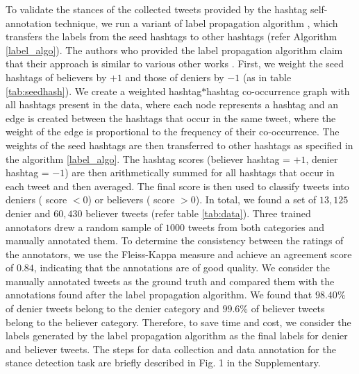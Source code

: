 \documentclass[letterpaper]{article}
\begin{document}
To validate the stances of the collected tweets provided by the hashtag self-annotation technique, we run a variant of label propagation algorithm \cite{tyagi2020polarizing,tyagi2020computational}, which transfers the labels from the seed hashtags to other hashtags (refer Algorithm \ref{label_algo}). The authors who provided the label propagation algorithm claim that their approach is similar to various other works \cite{weber2013secular,garimella2018quantifying}. First, we weight the seed hashtags of believers by $+1$ and those of deniers by $-1$ (as in table \ref{tab:seedhash}). We create a weighted hashtag$*$hashtag co-occurrence graph with all hashtags present in the data, where each node represents a hashtag and an edge is created between the hashtags that occur in the same tweet, where the weight of the edge is proportional to the frequency of their co-occurrence. The weights of the seed hashtags are then transferred to other hashtags as specified in the algorithm \ref{label_algo}. The hashtag scores (believer hashtag = $+1$, denier hashtag = $-1$) are then arithmetically summed for all hashtags that occur in each tweet and then averaged. The final score is then used to classify tweets into deniers ( score $< 0$) or believers ( score $> 0$). In total, we found a set of $13,125$ denier and $60,430$ believer tweets (refer table \ref{tab:data}). Three trained annotators drew a random sample of $1000$ tweets from both categories and manually annotated them. To determine the consistency between the ratings of the annotators, we use the Fleiss-Kappa \cite{spitzer1967quantification} measure and achieve an agreement score of $0.84$, indicating that the annotations are of good quality. We consider the manually annotated tweets as the ground truth and compared them with the annotations found after the label propagation algorithm. We found that $98.40\%$ of denier tweets belong to the denier category and $99.6\%$ of believer tweets belong to the believer category. Therefore, to save time and cost, we consider the labels generated by the label propagation algorithm as the final labels for denier and believer tweets. The steps for data collection and data annotation for the stance detection task are briefly described in Fig. 1 in the Supplementary.

\end{document}
